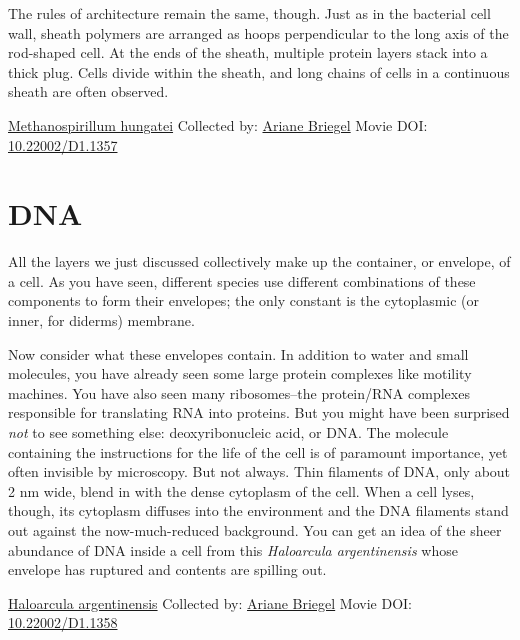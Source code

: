 \documentclass[]{tufte-book}
\begin{document}
The rules of architecture remain the same, though. Just as in the bacterial cell wall, sheath polymers are arranged as hoops perpendicular to the long axis of the rod-shaped cell. At the ends of the sheath, multiple protein layers stack into a thick plug. Cells divide within the sheath, and long chains of cells in a continuous sheath are often observed.



\hypertarget{htmlwidget-a436e2b6e4e9ba56b4b5}{}

\label{fig:2-8}\protect\hyperlink{tree}{Methanospirillum hungatei} Collected by: \protect\hyperlink{ariane_briegel}{Ariane Briegel} Movie DOI: \href{https://doi.org/10.22002/D1.1357}{10.22002/D1.1357}

\hypertarget{dna}{%
\section{DNA}\label{dna}}

All the layers we just discussed collectively make up the container, or envelope, of a cell. As you have seen, different species use different combinations of these components to form their envelopes; the only constant is the cytoplasmic (or inner, for diderms) membrane.

Now consider what these envelopes contain. In addition to water and small molecules, you have already seen some large protein complexes like motility machines. You have also seen many ribosomes--the protein/RNA complexes responsible for translating RNA into proteins. But you might have been surprised \emph{not} to see something else: deoxyribonucleic acid, or DNA. The molecule containing the instructions for the life of the cell is of paramount importance, yet often invisible by microscopy. But not always. Thin filaments of DNA, only about 2 nm wide, blend in with the dense cytoplasm of the cell. When a cell lyses, though, its cytoplasm diffuses into the environment and the DNA filaments stand out against the now-much-reduced background. You can get an idea of the sheer abundance of DNA inside a cell from this \emph{Haloarcula argentinensis} whose envelope has ruptured and contents are spilling out.



\hypertarget{htmlwidget-19cdd67a92532276b08d}{}

\label{fig:2-9}\protect\hyperlink{tree}{Haloarcula argentinensis} Collected by: \protect\hyperlink{ariane_briegel}{Ariane Briegel} Movie DOI: \href{https://doi.org/10.22002/D1.1358}{10.22002/D1.1358}
\end{document}
